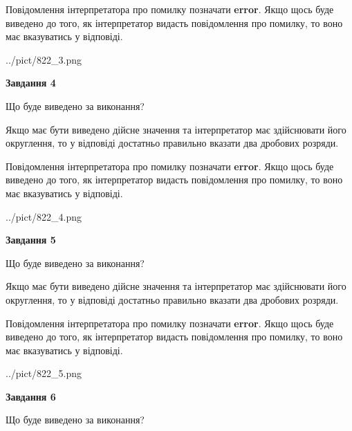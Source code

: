 \documentclass[12pt, ukrainian]{article}
\begin{document}
{\begin {Large}
Повідомлення інтерпретатора про помилку позначати \textbf{error}.
Якщо щось буде виведено до того, як інтерпретатор видасть повідомлення про помилку, 
то воно має вказуватись у відповіді. \par

\begin{center}
	{../pict/822_3.png}
\end{center}
\newpage

{\begin {center}\textbf{Завдання 4}\end {center}}\par
Що буде виведено за виконання? \par

Якщо має бути виведено дійсне значення та інтерпретатор має здійснювати його округлення, 
то у відповіді достатньо правильно вказати два дробових розряди.

Повідомлення інтерпретатора про помилку позначати \textbf{error}.
Якщо щось буде виведено до того, як інтерпретатор видасть повідомлення про помилку, 
то воно має вказуватись у відповіді. \par

\begin{center}
	{../pict/822_4.png}
\end{center}
\newpage

{\begin {center}\textbf{Завдання 5}\end {center}}\par
Що буде виведено за виконання? \par

Якщо має бути виведено дійсне значення та інтерпретатор має здійснювати його округлення, 
то у відповіді достатньо правильно вказати два дробових розряди.

Повідомлення інтерпретатора про помилку позначати \textbf{error}.
Якщо щось буде виведено до того, як інтерпретатор видасть повідомлення про помилку, 
то воно має вказуватись у відповіді. \par

\begin{center}
	{../pict/822_5.png}
\end{center}
\newpage

{\begin {center}\textbf{Завдання 6}\end {center}}\par
Що буде виведено за виконання? \par


\end{Large}}
\end{document}
